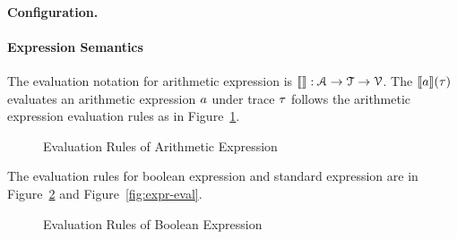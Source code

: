 \paragraph{Configuration.}
%
\paragraph{Expression Semantics}
The evaluation notation for arithmetic expression is $\llbracket  \rrbracket : \mathcal{A} \to \mathcal{T} \to \mathcal{V}$.
The $\llbracket a \rrbracket(\mathtt{\tau})$ evaluates an arithmetic expression $a$ under trace $\mathtt{\tau}$ follows the arithmetic expression evaluation rules as in Figure~\ref{fig:aexpr-eval}.
\begin{figure}
   \caption{Evaluation Rules of Arithmetic Expression}
   \label{fig:aexpr-eval}
   \end{figure}

 The evaluation rules for boolean expression and standard expression are in Figure~\ref{fig:bexpr-eval} and Figure~\ref{fig:expr-eval}.
 \begin{figure}
  \caption{Evaluation Rules of Boolean Expression}
  \label{fig:bexpr-eval}
  \end{figure}
  
